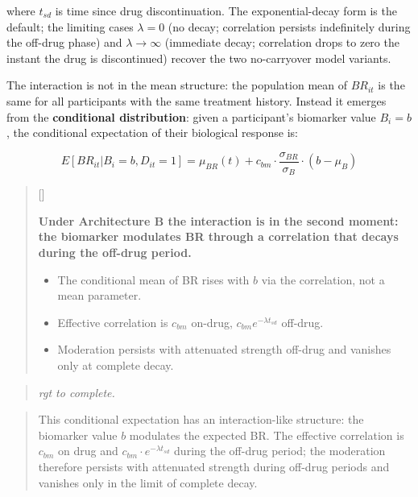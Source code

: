 \documentclass[
  11pt,
]{article}
\newcounter{pgraph}
\newenvironment{bullets}{%
  \stepcounter{pgraph}%
  \begin{quote}\small\sffamily\color[gray]{0.30}%
  {\normalfont\scriptsize\color[gray]{0.58}[\thepgraph]\enspace}}{%
  \end{quote}}
\newenvironment{rgt}{%
  \begin{quote}\small\itshape\color[RGB]{20,60,160}}{%
  \end{quote}}
\newenvironment{orig}{%
  \begin{quote}\normalsize\color[gray]{0.55}}{%
  \end{quote}}
\begin{document}
where \(t_{sd}\) is time since drug discontinuation. The
exponential-decay form is the default; the limiting cases
\(\lambda = 0\) (no decay; correlation persists indefinitely during the
off-drug phase) and \(\lambda \to \infty\) (immediate decay; correlation
drops to zero the instant the drug is discontinued) recover the two
no-carryover model variants.

The interaction is not in the mean structure: the population mean of
\(BR_{it}\) is the same for all participants with the same treatment
history. Instead it emerges from the \textbf{conditional distribution}:
given a participant's biomarker value \(B_i = b\), the conditional
expectation of their biological response is:

\[E[BR_{it} | B_i = b, D_{it} = 1] = \mu_{BR}(t) + c_{bm}
\cdot \frac{\sigma_{BR}}{\sigma_B} \cdot (b - \mu_B)\]

\begin{bullets}

\textbf{Under Architecture B the interaction is in the second
moment: the biomarker modulates BR through a correlation that
decays during the off-drug period.}

\begin{itemize}\setlength{\itemsep}{2pt}\setlength{\parskip}{0pt}
\item The conditional mean of BR rises with $b$ via the correlation,
not a mean parameter.
\item Effective correlation is $c_{bm}$ on-drug, $c_{bm}
e^{-\lambda t_{sd}}$ off-drug.
\item Moderation persists with attenuated strength off-drug and
vanishes only at complete decay.
\end{itemize}

\end{bullets}

\begin{rgt}
rgt to complete.

\end{rgt}

\begin{orig}
This conditional expectation has an interaction-like structure: the
biomarker value \(b\) modulates the expected BR. The effective
correlation is \(c_{bm}\) on drug and \(c_{bm} \cdot
e^{-\lambda t_{sd}}\) during the off-drug period; the moderation
therefore persists with attenuated strength during off-drug periods and
vanishes only in the limit of complete decay.

\end{orig}
\end{document}
